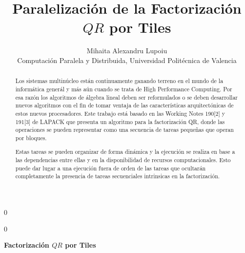 \documentclass[12pt]{article}
\newcommand{\blind}{0}
\begin{document}
%

\def\spacingset#1{\renewcommand{\baselinestretch}%
{#1}\small\normalsize} \spacingset{1}



\blind
{
  \title{\bf Paralelización de la Factorización $QR$ por Tiles}
  \author{Mihaita Alexandru Lupoiu\hspace{.2cm}\\
    Computación Paralela y Distribuida, Universidad Politécnica de Valencia}
  \maketitle
} \fi

\blind
{
  \bigskip
  \bigskip
  \bigskip
  \begin{center}
    {\LARGE\bf Factorización $QR$ por Tiles}
\end{center}
  \medskip
} \fi

\bigskip
\begin{abstract}

Los sistemas multinúcleo están continuamente ganando terreno en el mundo de la informática generál y más aún cuando se trata de High Performance Computing. Por esa razón los algoritmos de álgebra lineal deben ser reformulados o se deben desarrollar nuevos algoritmos con el fin de tomar ventaja de las características arquitectónicas de estos nuevos procesadores. Este trabajo está basado en las Working Notes 190[2] y 191[3] de LAPACK que presenta un algoritmo para la factorización QR, donde las operaciones se pueden representar como una secuencia de tareas pequeñas que operan por bloques.



 

Estas tareas se pueden organizar de forma dinámica y la ejecución se realiza en base a las dependencias entre ellas y en la disponibilidad de recursos computacionales. Esto puede dar lugar a una ejecución fuera de orden de las tareas que ocultarán completamente la presencia de tareas secuenciales intrinsicas en la factorización.



  
  \end{abstract}
\end{document}
